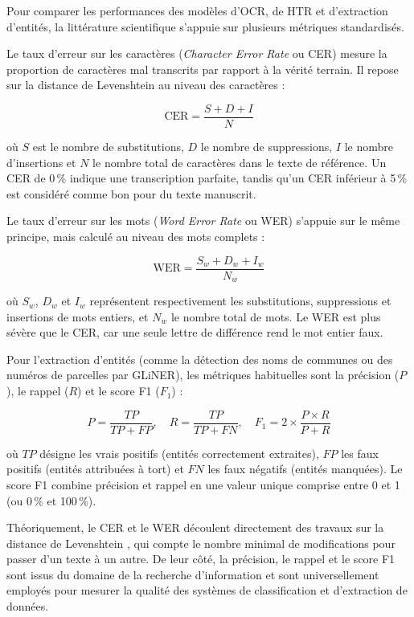 Pour comparer les performances des modèles d'OCR, de HTR et d'extraction d'entités, la littérature scientifique s'appuie sur plusieurs métriques standardisés.

Le taux d'erreur sur les caractères (\textit{Character Error Rate} ou CER) mesure la proportion de caractères mal transcrits par rapport à la vérité terrain. Il repose sur la distance de Levenshtein au niveau des caractères :

\begin{equation}
  \text{CER} = \frac{S + D + I}{N}
\end{equation}

où $S$ est le nombre de substitutions, $D$ le nombre de suppressions, $I$ le nombre d'insertions et $N$ le nombre total de caractères dans le texte de référence. Un CER de 0\,\% indique une transcription parfaite, tandis qu'un CER inférieur à 5\,\% est considéré comme bon pour du texte manuscrit.

Le taux d'erreur sur les mots (\textit{Word Error Rate} ou WER) s'appuie sur le même principe, mais calculé au niveau des mots complets :

\begin{equation}
  \text{WER} = \frac{S_w + D_w + I_w}{N_w}
\end{equation}

où $S_w$, $D_w$ et $I_w$ représentent respectivement les substitutions, suppressions et insertions de mots entiers, et $N_w$ le nombre total de mots. Le WER est plus sévère que le CER, car une seule lettre de différence rend le mot entier faux.

 Pour l'extraction d'entités (comme la détection des noms de communes ou des numéros de parcelles par GLiNER), les métriques habituelles sont la précision ($P$), le rappel ($R$) et le score F1 ($F_1$) :

\begin{equation}
  P = \frac{TP}{TP + FP}, \quad R = \frac{TP}{TP + FN}, \quad F_1 = 2 \times \frac{P \times R}{P + R}
\end{equation}

où $TP$ désigne les vrais positifs (entités correctement extraites), $FP$ les faux positifs (entités attribuées à tort) et $FN$ les faux négatifs (entités manquées). Le score F1 combine précision et rappel en une valeur unique comprise entre 0 et 1 (ou 0\,\% et 100\,\%).

Théoriquement, le CER et le WER découlent directement des travaux sur la distance de Levenshtein \citep{levenshtein_binary_1966}, qui compte le nombre minimal de modifications pour passer d'un texte à un autre. De leur côté, la précision, le rappel et le score F1 sont issus du domaine de la recherche d'information et sont universellement employés pour mesurer la qualité des systèmes de classification et d'extraction de données.

